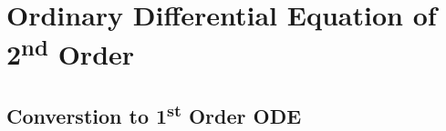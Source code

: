\documentclass[./\jobname.tex]{subfiles}
\begin{document}
\chapter{Ordinary Differential Equation of 2\textsuperscript{nd} Order}

\section{Converstion to 1\textsuperscript{st} Order ODE}
\end{document}
